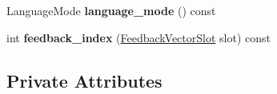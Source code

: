 \begin{DoxyCompactItemize}
\item 
Language\+Mode {\bfseries language\+\_\+mode} () const \hypertarget{classv8_1_1internal_1_1interpreter_1_1_bytecode_generator_a91d53d3214867417cde6f29dbbfb2065}{}\label{classv8_1_1internal_1_1interpreter_1_1_bytecode_generator_a91d53d3214867417cde6f29dbbfb2065}

\item 
int {\bfseries feedback\+\_\+index} (\hyperlink{classv8_1_1internal_1_1_feedback_vector_slot}{Feedback\+Vector\+Slot} slot) const \hypertarget{classv8_1_1internal_1_1interpreter_1_1_bytecode_generator_ad0cfe85dfa814467ba1b4b3f7b27a7c0}{}\label{classv8_1_1internal_1_1interpreter_1_1_bytecode_generator_ad0cfe85dfa814467ba1b4b3f7b27a7c0}

\end{DoxyCompactItemize}
\subsection*{Private Attributes}
